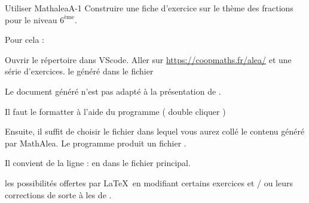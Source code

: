 \def\rdifficulty{2}
\begin{EXO}{Utiliser Mathalea}{A-1}
    Construire une fiche d'exercice sur le thème des fractions pour le niveau $6^\text{ème}$.
    
    Pour cela : 
    \begin{tcbenumerate}
        \tcbitem Ouvrir le répertoire  dans VScode.
        \tcbitem Aller sur \href{https://coopmaths.fr/alea/}{https://coopmaths.fr/alea/} et  une série d'exercices.
        \tcbitem {} le  généré dans le fichier
        
        \tcbitem \bcattention Le document généré n'est pas adapté à la présentation de \bfcours. 

        Il faut le formatter à l'aide du programme  ( double cliquer )

        Ensuite, il suffit de choisir le fichier   dans lequel vous aurez collé le contenu généré par MathAlea.
        \tcbitem Le programme produit un fichier . 

        Il convient de  la ligne : 
         en  dans le fichier principal.

        \tcbitem {} les possibilités offertes par \LaTeX\ en modifiant certains exercices et / ou leurs corrections de sorte à  les  de \bfcours.
    \end{tcbenumerate}
\end{EXO}